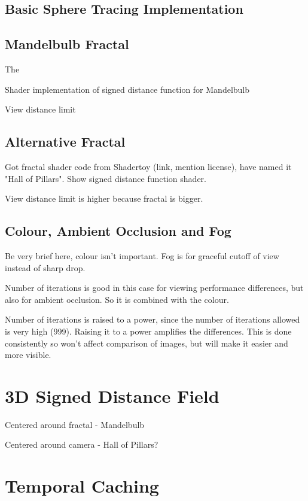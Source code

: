 \subsection{Basic Sphere Tracing Implementation}



\subsection{Mandelbulb Fractal}

The 

Shader implementation of signed distance function for Mandelbulb

View distance limit

\subsection{Alternative Fractal}

Got fractal shader code from Shadertoy (link, mention license), have named it "Hall of Pillars". Show signed distance function shader.

View distance limit is higher because fractal is bigger.

\subsection{Colour, Ambient Occlusion and Fog}

Be very brief here, colour isn't important. Fog is for graceful cutoff of view instead of sharp drop.

Number of iterations is good in this case for viewing performance differences, but also for ambient occlusion. So it is combined with the colour.

Number of iterations is raised to a power, since the number of iterations allowed is very high (999). Raising it to a power amplifies the differences. This is done consistently so won't affect comparison of images, but will make it easier and more visible.

\section{3D Signed Distance Field}

Centered around fractal - Mandelbulb

Centered around camera - Hall of Pillars?

\section{Temporal Caching}


